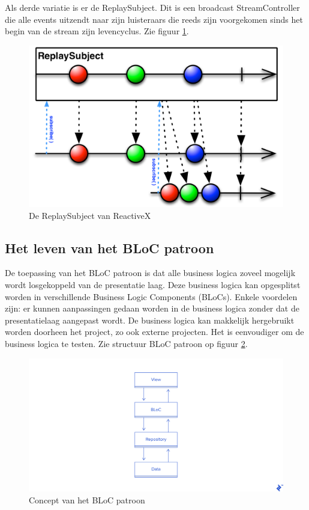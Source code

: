 Als derde variatie is er de ReplaySubject. Dit is een broadcast StreamController die alle events uitzendt naar zijn luisteraars die reeds zijn voorgekomen sinds het begin van de stream zijn levencyclus. Zie figuur \ref{fig:rxdart-replaysubject}.

\begin{figure}[H]
    \centering
    \includegraphics[width=\figureWidthModifier\linewidth]{img/stand-van-zaken/rxdart-replaysubject.png}
    \caption{De ReplaySubject van ReactiveX \autocite{Boelens2018}}
    \label{fig:rxdart-replaysubject}
\end{figure}

\subsection*{Het leven van het BLoC patroon}
De toepassing van het BLoC patroon is dat alle business logica zoveel mogelijk wordt losgekoppeld van de presentatie laag. Deze business logica kan opgesplitst worden in verschillende Business Logic Components (BLoCs). 
\newline
Enkele voordelen zijn: er kunnen aanpassingen gedaan worden in de business logica zonder dat de presentatielaag aangepast wordt. De business logica kan makkelijk hergebruikt worden doorheen het project, zo ook externe projecten. Het is eenvoudiger om de business logica te testen. Zie structuur BLoC patroon op figuur \ref{fig:bloc-pattern}.

\begin{figure}[H]
    \centering
    \includegraphics[width=\figureWidthModifier\linewidth]{img/stand-van-zaken/bloc-pattern.png}
    \caption{Concept van het BLoC patroon \autocite{Perutovic2018}}
    \label{fig:bloc-pattern}
\end{figure}

